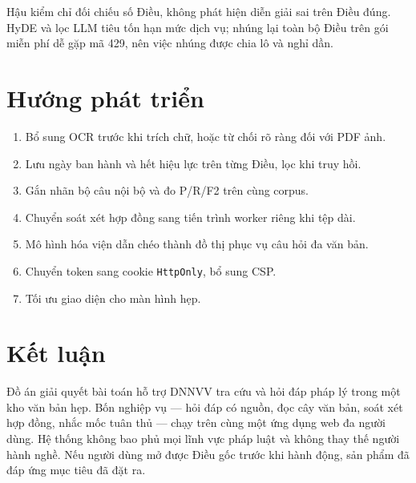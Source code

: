 Hậu kiểm chỉ đối chiếu số Điều, không phát hiện diễn giải sai trên Điều đúng.
HyDE và lọc LLM tiêu tốn hạn mức dịch vụ; nhúng lại toàn bộ \soDieu{} Điều trên
gói miễn phí dễ gặp mã 429, nên việc nhúng được chia lô và nghỉ dần.

\section{Hướng phát triển}

\begin{enumerate}
    \item Bổ sung OCR trước khi trích chữ, hoặc từ chối rõ ràng đối với PDF ảnh.
    \item Lưu ngày ban hành và hết hiệu lực trên từng Điều, lọc khi truy hồi.
    \item Gắn nhãn bộ câu nội bộ và đo P/R/F2 trên cùng corpus.
    \item Chuyển soát xét hợp đồng sang tiến trình worker riêng khi tệp dài.
    \item Mô hình hóa viện dẫn chéo thành đồ thị phục vụ câu hỏi đa văn bản.
    \item Chuyển token sang cookie \texttt{HttpOnly}, bổ sung CSP.
    \item Tối ưu giao diện cho màn hình hẹp.
\end{enumerate}

\section{Kết luận}

Đồ án giải quyết bài toán hỗ trợ DNNVV tra cứu và hỏi đáp pháp lý trong một kho
văn bản hẹp. Bốn nghiệp vụ --- hỏi đáp có nguồn, đọc cây văn bản, soát xét hợp
đồng, nhắc mốc tuân thủ --- chạy trên cùng một ứng dụng web đa người dùng. Hệ
thống không bao phủ mọi lĩnh vực pháp luật và không thay thế người hành nghề.
Nếu người dùng mở được Điều gốc trước khi hành động, sản phẩm đã đáp ứng mục
tiêu đã đặt ra.

